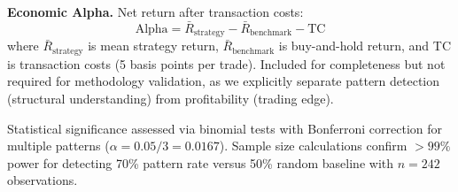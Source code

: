 \medskip
\textbf{Economic Alpha.} Net return after transaction costs:
\begin{equation}
\text{Alpha} = \bar{R}_{\text{strategy}} - \bar{R}_{\text{benchmark}} - \text{TC}
\end{equation}
where $\bar{R}_{\text{strategy}}$ is mean strategy return, $\bar{R}_{\text{benchmark}}$ is buy-and-hold return, and TC is transaction costs (5 basis points per trade). Included for completeness but not required for methodology validation, as we explicitly separate pattern detection (structural understanding) from profitability (trading edge).

Statistical significance assessed via binomial tests with Bonferroni correction for multiple patterns ($\alpha = 0.05/3 = 0.0167$). Sample size calculations confirm $>99\%$ power for detecting 70\% pattern rate versus 50\% random baseline with $n=242$ observations.